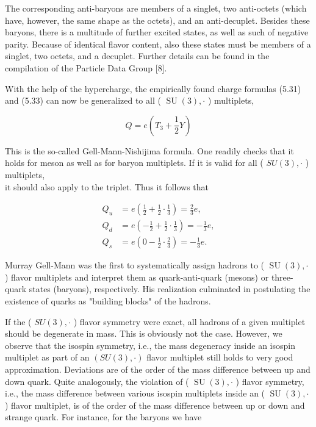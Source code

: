 \documentclass[10pt, letterpaper]{article}
\begin{document}
The corresponding anti-baryons are members of a singlet, two anti-octets (which have, however, the same shape as the octets), and an anti-decuplet. Besides these baryons, there is a multitude of further excited states, as well as such of negative parity. Because of identical flavor content, also these states must be members of a singlet, two octets, and a decuplet. Further details can be found in the compilation of the Particle Data Group [8].

With the help of the hypercharge, the empirically found charge formulas (5.31) and (5.33) can now be generalized to all ( $\operatorname{SU}(3), \cdot$ ) multiplets,

$$
Q=e\left(T_{3}+\frac{1}{2} Y\right)
$$

This is the so-called Gell-Mann-Nishijima formula. One readily checks that it holds for meson as well as for baryon multiplets. If it is valid for all ( $S U(3), \cdot$ ) multiplets,\\
it should also apply to the triplet. Thus it follows that

$$
\begin{aligned}
Q_{u} & =e\left(\frac{1}{2}+\frac{1}{2} \cdot \frac{1}{3}\right)=\frac{2}{3} e, \\
Q_{d} & =e\left(-\frac{1}{2}+\frac{1}{2} \cdot \frac{1}{3}\right)=-\frac{1}{3} e, \\
Q_{s} & =e\left(0-\frac{1}{2} \cdot \frac{2}{3}\right)=-\frac{1}{3} e .
\end{aligned}
$$

Murray Gell-Mann was the first to systematically assign hadrons to ( $\operatorname{SU}(3), \cdot$ ) flavor multiplets and interpret them as quark-anti-quark (mesons) or three-quark states (baryons), respectively. His realization culminated in postulating the existence of quarks as "building blocks" of the hadrons.

If the ( $S U(3), \cdot$ ) flavor symmetry were exact, all hadrons of a given multiplet should be degenerate in mass. This is obviously not the case. However, we observe that the isospin symmetry, i.e., the mass degeneracy inside an isospin multiplet as part of an $(S U(3), \cdot)$ flavor multiplet still holds to very good approximation. Deviations are of the order of the mass difference between up and down quark. Quite analogously, the violation of ( $\operatorname{SU}(3), \cdot$ ) flavor symmetry, i.e., the mass difference between various isospin multiplets inside an ( $\operatorname{SU}(3), \cdot$ ) flavor multiplet, is of the order of the mass difference between up or down and strange quark. For instance, for the baryons we have
\end{document}

